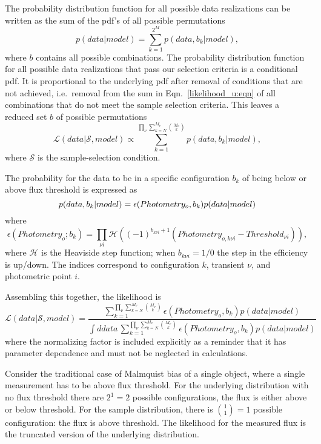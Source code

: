 \documentclass[preprint,3p]{elsarticle}
\begin{document}
The probability distribution function for all possible data realizations can be written
as the sum of the pdf's of all possible permutations
\begin{equation}
p(data|model) = \sum_{k=1}^{2^M} p(data, b_k| model),
\label{likelihood_u:eqn}
\end{equation}
where $b$ contains all possible combinations.
The probability distribution function for all possible data realizations that pass
our selection criteria is a conditional pdf. It is proportional to the underlying
pdf after removal of conditions that are not achieved, i.e.\ removal from the sum
in Eqn.~\ref{likelihood_u:eqn} of all combinations that do not meet the sample
selection criteria. This leaves a reduced set $b$ of
possible permutations
\begin{equation}
\mathcal{L}(data|\mathcal{S}, model) \propto \sum_{k=1}^{\prod_\nu \sum_{k=N}^{M_{\nu}} \binom{M_{\nu}}{k}} p(data, b_k| model),
\end{equation}
where $\mathcal{S}$ is the sample-selection condition.

The probability for the data to be in a specific configuration $b_k$ of
being below or above flux threshold is expressed
as
\begin{equation}
p(data, b_k| model)  = \epsilon(Photometry_o, b_k)p(data| model)\\
\end{equation}
where
\begin{equation}
\epsilon(Photometry_o; b_{k})= \prod_{\nu i}\mathcal{H}\left((-1)^{b_{k\nu i}+1}(Photometry_{o,k\nu i}-Threshold_{\nu i})\right),
\end{equation}
where $\mathcal{H}$ is the Heaviside step function; when $b_{k\nu i}=1/0$ the step in the efficiency
is up/down.  The indices correspond to configuration $k$,
transient $\nu$, and photometric point $i$.

Assembling this together, the likelihood is
\begin{equation}
\mathcal{L}(data|\mathcal{S}, model) = \frac{\sum_{k=1}^{\prod_\nu \sum_{k=N}^{M_{\nu}} \binom{M_{\nu}}{k}} \epsilon(Photometry_o, b_k)p(data| model)}{\int ddata\,
\sum_{k=1}^{\prod_\nu \sum_{k=N}^{M_{\nu}} \binom{M_{\nu}}{k}} \epsilon(Photometry_o, b_k)p(data| model)
}
\end{equation}
where the normalizing factor is included explicitly as a reminder that it has 
parameter dependence and must not be neglected in calculations.

Consider the traditional case of Malmquist bias of a single object,
where a single measurement has
to be above flux threshold.  For the underlying distribution with no flux threshold there
are $2^1=2$ possible configurations, the flux is either above or below threshold.  For
the sample distribution, there is $\binom{1}{1}=1$ possible configuration: the flux
is above threshold.   The likelihood for the measured flux is the truncated version
of the underlying distribution.
\end{document}
